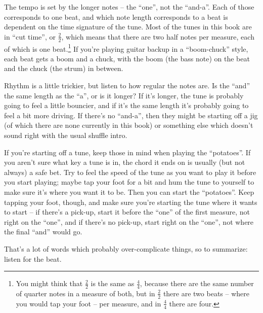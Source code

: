 The tempo is set by the longer notes -- the ``one'', not the
``and-a''.  Each of those corresponds to one beat, and which note
length corresponds to a beat is dependent on the time signature of the
tune. Most of the tunes in this book are in ``cut time'', or
$\tfrac{2}{2}$, which means that there are two half notes per measure,
each of which is one beat.\footnote{You might think that
$\tfrac{2}{2}$ is the same as $\tfrac{4}{4}$, because there are the
same number of quarter notes in a measure of both, but in
$\tfrac{2}{2}$ there are two beats -- where you would tap your foot
-- per measure, and in $\tfrac{4}{4}$ there are four.} If you're
playing guitar backup in a ``boom-chuck'' style, each beat gets a boom
and a chuck, with the boom (the bass note) on the beat and the chuck
(the strum) in between.

Rhythm is a little trickier, but listen to how regular the notes
are. Is the ``and'' the same length as the ``a'', or is it longer? If
it's longer, the tune is probably going to feel a little bouncier, and
if it's the same length it's probably going to feel a bit more
driving. If there's no ``and-a'', then they might be starting off a
jig (of which there are none currently in this book) or something else
which doesn't sound right with the usual shuffle intro.

If you're starting off a tune, keep those in mind when playing the
``potatoes''. If you aren't sure what key a tune is in, the chord it
ends on is usually (but not always) a safe bet. Try to feel the speed
of the tune as you want to play it before you start playing; maybe tap
your foot for a bit and hum the tune to yourself to make sure it's
where you want it to be. Then you can start the ``potatoes''. Keep
tapping your foot, though, and make sure you're starting the tune
where it wants to start -- if there's a pick-up, start it before the
``one'' of the first measure, not right on the ``one'', and if there's
no pick-up, start right on the ``one'', not where the final ``and''
would go.

That's a lot of words which probably over-complicate things, so to 
summarize: listen for the beat.



\cleardoublepage
